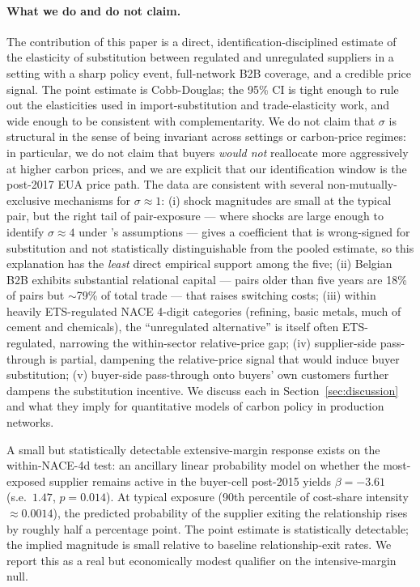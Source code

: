 \paragraph{What we do and do not claim.} The contribution of this paper is a direct, identification-disciplined estimate of the elasticity of substitution between regulated and unregulated suppliers in a setting with a sharp policy event, full-network B2B coverage, and a credible price signal. The point estimate is Cobb-Douglas; the 95\% CI is tight enough to rule out the elasticities used in import-substitution and trade-elasticity work, and wide enough to be consistent with complementarity. We do not claim that $\sigma$ is structural in the sense of being invariant across settings or carbon-price regimes: in particular, we do not claim that buyers \textit{would not} reallocate more aggressively at higher carbon prices, and we are explicit that our identification window is the post-2017 EUA price path. The data are consistent with several non-mutually-exclusive mechanisms for $\sigma \approx 1$: (i) shock magnitudes are small at the typical pair, but the right tail of pair-exposure --- where shocks are large enough to identify $\sigma \approx 4$ under \citet{peter2023}'s assumptions --- gives a coefficient that is wrong-signed for substitution and not statistically distinguishable from the pooled estimate, so this explanation has the \emph{least} direct empirical support among the five; (ii) Belgian B2B exhibits substantial relational capital --- pairs older than five years are 18\% of pairs but $\sim$79\% of total trade --- that raises switching costs; (iii) within heavily ETS-regulated NACE 4-digit categories (refining, basic metals, much of cement and chemicals), the ``unregulated alternative'' is itself often ETS-regulated, narrowing the within-sector relative-price gap; (iv) supplier-side pass-through is partial, dampening the relative-price signal that would induce buyer substitution; (v) buyer-side pass-through onto buyers' own customers further dampens the substitution incentive. We discuss each in Section~\ref{sec:discussion} and what they imply for quantitative models of carbon policy in production networks.

A small but statistically detectable extensive-margin response exists on the within-NACE-4d test: an ancillary linear probability model on whether the most-exposed supplier remains active in the buyer-cell post-2015 yields $\beta = -3.61$ (s.e.\ $1.47$, $p = 0.014$). At typical exposure (90th percentile of cost-share intensity $\approx 0.0014$), the predicted probability of the supplier exiting the relationship rises by roughly half a percentage point. The point estimate is statistically detectable; the implied magnitude is small relative to baseline relationship-exit rates. We report this as a real but economically modest qualifier on the intensive-margin null.

